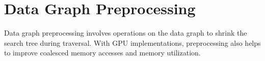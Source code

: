 


\section{Data Graph Preprocessing}\label{graph-preprocessing}

Data graph preprocessing involves operations on the data graph to shrink the search tree during traversal.
With GPU implementations, preprocessing also helps to improve coalesced memory accesses and memory utilization.


